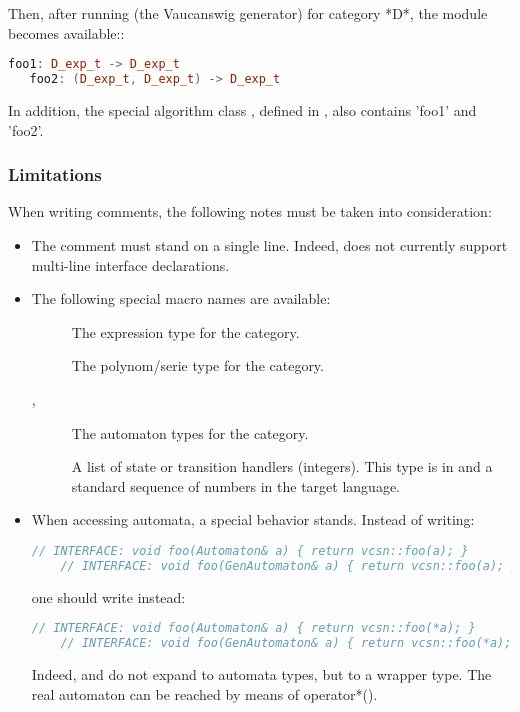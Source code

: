 Then,  after  running    (the Vaucanswig  generator)  for
category *D*, the module  becomes available::

\begin{lstlisting}[language=C++]
   foo1: D_exp_t -> D_exp_t
   foo2: (D_exp_t, D_exp_t) -> D_exp_t
\end{lstlisting}
 
In   addition,  the   special  algorithm   class  ,   defined  in
, also contains 'foo1' and 'foo2'.
  
\subsubsection{Limitations}

When writing   comments, the following  notes must be
taken into consideration:

\begin{itemize}
\item The comment must stand on a single line.  Indeed,
   does not currently support multi-line interface
  declarations.

\item The following special macro names are available:

  \begin{description}
  \item[] The expression type for the category.
  \item[] The polynom/serie type for the category.
  \item[, ] The automaton types for
    the category.
  \item[] A list of state or transition handlers
    (integers). This type is  in \Cxx and a
    standard sequence of numbers in the target language.
  \end{description}

\item When accessing automata, a special behavior stands. Instead of
  writing:
 
  \begin{lstlisting}[language=C++]
    // INTERFACE: void foo(Automaton& a) { return vcsn::foo(a); }
    // INTERFACE: void foo(GenAutomaton& a) { return vcsn::foo(a); }
  \end{lstlisting}

  one should write instead:

  \begin{lstlisting}[language=C++]
    // INTERFACE: void foo(Automaton& a) { return vcsn::foo(*a); }
    // INTERFACE: void foo(GenAutomaton& a) { return vcsn::foo(*a); }    
  \end{lstlisting}
    
  Indeed,     and    do   not  expand  to
  \Vauc automata types, but to  a wrapper type. The real automaton
  can be reached by means of operator*().

\end{itemize}

